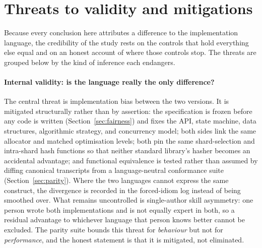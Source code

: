 \documentclass[english,twoside,openright,a4paper,censored,csm,software-track-2020]{HYthesisML}
\begin{document}
\section{Threats to validity and mitigations}
Because every conclusion here attributes a difference to the implementation language, the
credibility of the study rests on the controls that hold everything else equal and on an
honest account of where those controls stop. The threats are grouped below by the kind of
inference each endangers.

\paragraph{Internal validity: is the language really the only difference?}
The central threat is implementation bias between the two versions. It is mitigated
structurally rather than by assertion: the specification is frozen before any code is written
(Section~\ref{sec:fairness}) and fixes the API, state machine, data structures, algorithmic
strategy, and concurrency model; both sides link the same allocator and matched optimisation
levels; both pin the same shard-selection and intra-shard hash functions so that neither
standard library's hasher becomes an accidental advantage; and functional equivalence is
tested rather than assumed by diffing canonical transcripts from a language-neutral
conformance suite (Section~\ref{sec:parity}). Where the two languages cannot express the same
construct, the divergence is recorded in the forced-idiom log instead of being smoothed over.
What remains uncontrolled is single-author skill asymmetry: one person wrote both
implementations and is not equally expert in both, so a residual advantage to whichever
language that person knows better cannot be excluded. The parity suite bounds this threat for
\emph{behaviour} but not for \emph{performance}, and the honest statement is that it is
mitigated, not eliminated.
\end{document}
